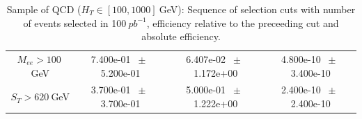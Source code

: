 \begin{table}[htbp]
\begin{center}
\begin{tabular}{|c|c|c|c|}
          $M_{ee}>100~$GeV          &           7.400e-01          $~\pm~$          5.200e-01           &           6.407e-02          $~\pm~$          1.172e+00           &           4.800e-10          $~\pm~$          3.400e-10          \\          
          $ S_T>620~$GeV           &           3.700e-01          $~\pm~$          3.700e-01           &           5.000e-01          $~\pm~$          1.222e+00           &           2.400e-10          $~\pm~$          2.400e-10          \\          
          \hline\hline 
\end{tabular} 
\end{center} 
\caption{Sample of QCD ($H_T \in [100,1000]~$GeV): Sequence of selection cuts with number of events selected in 100$~pb^{-1}$, efficiency relative to the preceeding cut and absolute efficiency.} 
\label{tab:effic-QCD} 
\end{table} 

